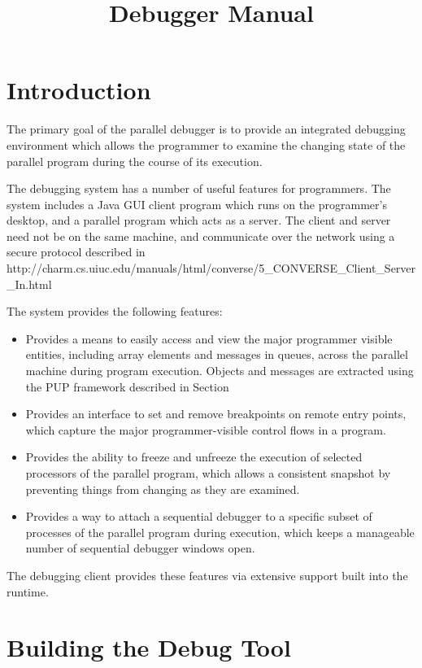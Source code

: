 \documentclass[10pt,dvips]{article}
\title{\Charm Debugger{} Manual}
\begin{document}
\section{Introduction}

The primary goal of the parallel debugger is to provide an integrated
debugging environment which allows the programmer to examine the
changing state of the parallel program during the course of its
execution.

The \charmpp{} debugging system has a number of useful features for
\charmpp{} programmers.  The system includes a Java GUI client program
which runs on the programmer's desktop, and a \charmpp{} parallel
program which acts as a server.  The client and server need not be on
the same machine, and communicate over the network using a secure
protocol described in
 http://charm.cs.uiuc.edu/manuals/html/converse/5\_CONVERSE\_Client\_Server\_In.html 

The system provides the following features: 

\begin{itemize}

\item Provides a means to easily access and view the major programmer
visible entities, including array elements and messages in queues,
across the parallel machine during program execution.  Objects and
messages are extracted using the \charmpp{} PUP framework described in
Section%

\item Provides an interface to set and remove breakpoints on remote
entry points, which capture the major
programmer-visible control flows in a \charmpp{} program. 

\item Provides the ability to freeze and unfreeze the execution of 
selected processors of the parallel program, which allows a 
consistent snapshot by 
preventing things from changing as they are examined.

\item Provides a way to attach a sequential debugger to a specific
subset of processes of the parallel program during execution,
which keeps a manageable number of sequential debugger windows open.

\end{itemize}

The debugging client provides these features via 
extensive support built into the \charmpp{} runtime.

\section{Building the \charmpp{} Debug Tool}
\end{document}
